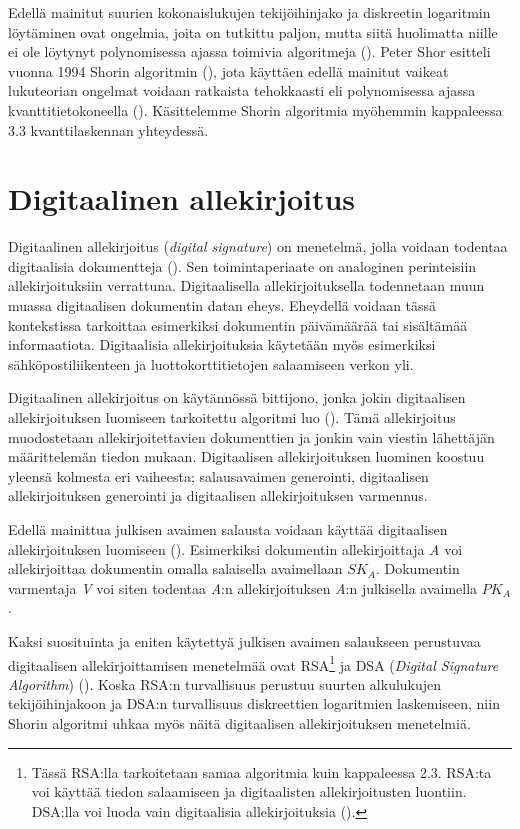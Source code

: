  Edellä mainitut suurien kokonaislukujen tekijöihinjako ja diskreetin logaritmin löytäminen ovat ongelmia, joita on tutkittu paljon, mutta siitä huolimatta niille ei ole löytynyt polynomisessa ajassa toimivia algoritmeja (\cite{doi:10.1137/S0036144598347011}). Peter Shor esitteli vuonna 1994 Shorin algoritmin (\cite{mavroeidis2018impact}), jota käyttäen edellä mainitut vaikeat lukuteorian ongelmat voidaan ratkaista tehokkaasti eli polynomisessa ajassa kvanttitietokoneella (\cite{doi:10.1137/S0036144598347011}). Käsittelemme Shorin algoritmia myöhemmin kappaleessa 3.3 kvanttilaskennan yhteydessä.
 
 \section{Digitaalinen allekirjoitus}
 Digitaalinen allekirjoitus (\emph{digital signature}) on menetelmä, jolla voidaan todentaa digitaalisia dokumentteja (\cite{1649003}). Sen toimintaperiaate on analoginen perinteisiin allekirjoituksiin verrattuna. Digitaalisella allekirjoituksella todennetaan muun muassa digitaalisen dokumentin datan eheys. Eheydellä voidaan tässä kontekstissa tarkoittaa esimerkiksi dokumentin päivämäärää tai sisältämää informaatiota. Digitaalisia allekirjoituksia käytetään myös esimerkiksi sähköpostiliikenteen ja luottokorttitietojen salaamiseen verkon yli.
 
 Digitaalinen allekirjoitus on käytännössä bittijono, jonka jokin digitaalisen allekirjoituksen luomiseen tarkoitettu algoritmi luo (\cite{1649003}). Tämä allekirjoitus muodostetaan allekirjoitettavien dokumenttien ja jonkin vain viestin lähettäjän määrittelemän tiedon mukaan. Digitaalisen allekirjoituksen luominen koostuu yleensä kolmesta eri vaiheesta; salausavaimen generointi, digitaalisen allekirjoituksen generointi ja digitaalisen allekirjoituksen varmennus.
 
 Edellä mainittua julkisen avaimen salausta voidaan käyttää digitaalisen allekirjoituksen luomiseen (\cite{mavroeidis2018impact}). Esimerkiksi dokumentin allekirjoittaja \emph{A} voi allekirjoittaa dokumentin omalla salaisella avaimellaan $SK_{A}$. Dokumentin varmentaja \emph{V} voi siten todentaa \emph{A}:n allekirjoituksen \emph{A}:n julkisella avaimella $PK_{A}$.
 
 Kaksi suosituinta ja eniten käytettyä julkisen avaimen salaukseen perustuvaa digitaalisen allekirjoittamisen menetelmää ovat RSA\footnote{Tässä RSA:lla tarkoitetaan samaa algoritmia kuin kappaleessa 2.3. RSA:ta voi käyttää tiedon salaamiseen ja digitaalisten allekirjoitusten luontiin. DSA:lla voi luoda vain digitaalisia allekirjoituksia (\cite{4659731}).} ja DSA (\emph{Digital Signature Algorithm}) (\cite{1649003}). Koska RSA:n turvallisuus perustuu suurten alkulukujen tekijöihinjakoon ja DSA:n turvallisuus diskreettien logaritmien laskemiseen, niin Shorin algoritmi uhkaa myös näitä digitaalisen allekirjoituksen menetelmiä.